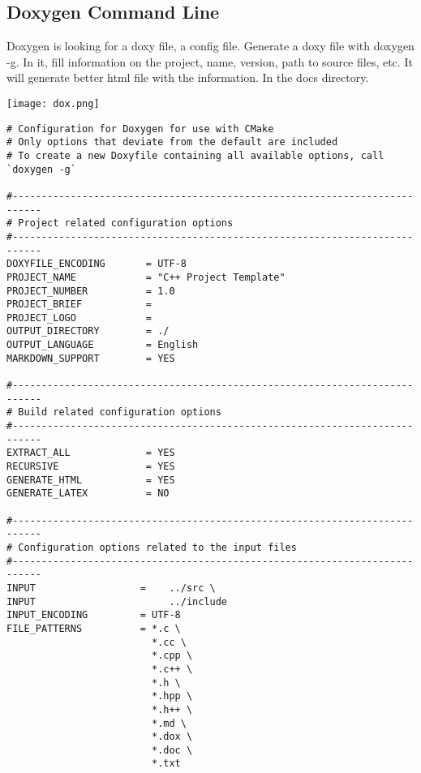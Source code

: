 \subsection{Doxygen Command Line}

Doxygen is looking for a doxy file, a config file. Generate a doxy file with doxygen -g.
In it, fill information on the project, name, version,  path to source files, etc. It will generate better html file with the information.
In the docs directory.

\begin{center}
    \texttt{[image: dox.png]}
\end{center}

\begin{verbatim}
# Configuration for Doxygen for use with CMake
# Only options that deviate from the default are included
# To create a new Doxyfile containing all available options, call `doxygen -g`

#---------------------------------------------------------------------------
# Project related configuration options
#---------------------------------------------------------------------------
DOXYFILE_ENCODING       = UTF-8
PROJECT_NAME            = "C++ Project Template"
PROJECT_NUMBER          = 1.0
PROJECT_BRIEF           =
PROJECT_LOGO            =
OUTPUT_DIRECTORY        = ./
OUTPUT_LANGUAGE         = English
MARKDOWN_SUPPORT        = YES

#---------------------------------------------------------------------------
# Build related configuration options
#---------------------------------------------------------------------------
EXTRACT_ALL             = YES
RECURSIVE               = YES
GENERATE_HTML           = YES
GENERATE_LATEX          = NO

#---------------------------------------------------------------------------
# Configuration options related to the input files
#---------------------------------------------------------------------------
INPUT                  =    ../src \
INPUT                       ../include
INPUT_ENCODING         = UTF-8
FILE_PATTERNS          = *.c \
                         *.cc \
                         *.cpp \
                         *.c++ \
                         *.h \
                         *.hpp \
                         *.h++ \
                         *.md \
                         *.dox \
                         *.doc \
                         *.txt
\end{verbatim}

